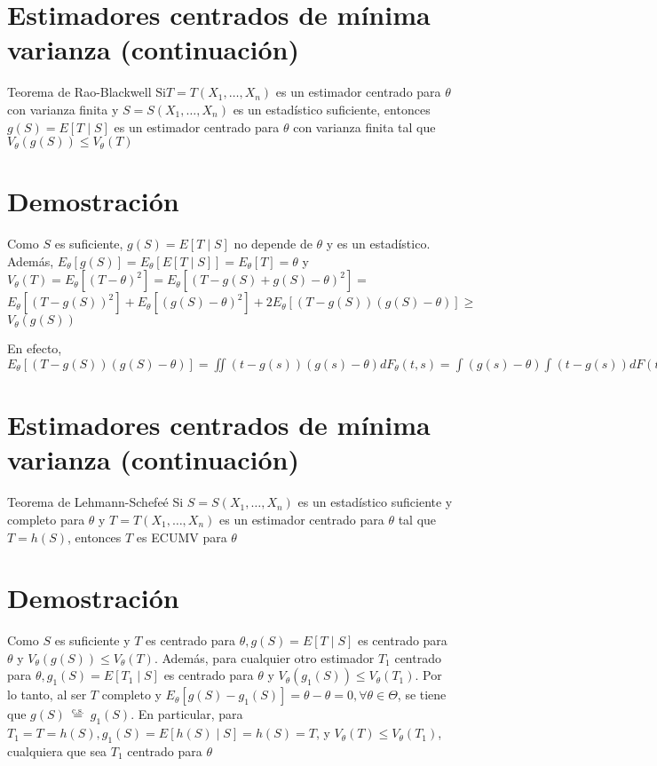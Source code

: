 \section*{Estimadores centrados de mínima varianza (continuación)}
Teorema de Rao-Blackwell $\mathrm{Si} T=T\left(X_{1}, \ldots, X_{n}\right)$ es un estimador centrado para $\theta$ con varianza finita y $S=S\left(X_{1}, \ldots, X_{n}\right)$ es un estadístico suficiente, entonces $g(S)=E[T \mid S]$ es un estimador centrado para $\theta$ con varianza finita tal que $V_{\theta}(g(S)) \leq V_{\theta}(T)$

\section*{Demostración}
Como $S$ es suficiente, $g(S)=E[T \mid S]$ no depende de $\theta$ y es un estadístico. Además, $E_{\theta}[g(S)]=E_{\theta}[E[T \mid S]]=E_{\theta}[T]=\theta$ y\\
$V_{\theta}(T)=E_{\theta}\left[(T-\theta)^{2}\right]=E_{\theta}\left[(T-g(S)+g(S)-\theta)^{2}\right]=$ $E_{\theta}\left[(T-g(S))^{2}\right]+E_{\theta}\left[(g(S)-\theta)^{2}\right]+2 E_{\theta}[(T-g(S))(g(S)-\theta)] \geq$ $V_{\theta}(g(S))$

En efecto, $E_{\theta}[(T-g(S))(g(S)-\theta)]=\iint(t-g(s))(g(s)-\theta) d F_{\theta}(t, s)=\int(g(s)-\theta) \int(t-g(s)) d F(t \mid s) d F_{\theta}(s)=0$

\section*{Estimadores centrados de mínima varianza (continuación)}
Teorema de Lehmann-Schefeé Si $S=S\left(X_{1}, \ldots, X_{n}\right)$ es un estadístico suficiente y completo para $\theta$ y $T=T\left(X_{1}, \ldots, X_{n}\right)$ es un estimador centrado para $\theta$ tal que $T=h(S)$, entonces $T$ es ECUMV para $\theta$

\section*{Demostración}
Como $S$ es suficiente y $T$ es centrado para $\theta, g(S)=E[T \mid S]$ es centrado para $\theta$ y $V_{\theta}(g(S)) \leq V_{\theta}(T)$. Además, para cualquier otro estimador $T_{1}$ centrado para $\theta, g_{1}(S)=E\left[T_{1} \mid S\right]$ es centrado para $\theta$ y $V_{\theta}\left(g_{1}(S)\right) \leq V_{\theta}\left(T_{1}\right)$. Por lo tanto, al ser $T$ completo y $E_{\theta}\left[g(S)-g_{1}(S)\right]=\theta-\theta=0, \forall \theta \in \Theta$, se tiene que $g(S) \stackrel{\text { c.s. }}{=} g_{1}(S)$. En particular, para $T_{1}=T=h(S), g_{1}(S)=E[h(S) \mid S]=h(S)=T$, y $V_{\theta}(T) \leq V_{\theta}\left(T_{1}\right)$, cualquiera que sea $T_{1}$ centrado para $\theta$

